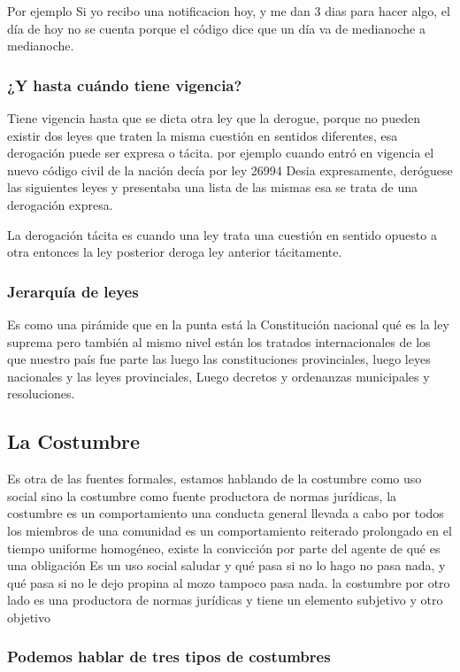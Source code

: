 \documentclass[12pt]{book}
\begin{document}
Por ejemplo
Si yo recibo una notificacion hoy, y me dan 3 dias para hacer algo, el día de hoy no se cuenta porque el código dice que un día va de medianoche a medianoche.

\subsubsection{¿Y hasta cuándo tiene vigencia?}
Tiene vigencia hasta que se dicta otra ley que la derogue, porque no pueden existir dos leyes que traten la misma cuestión en sentidos diferentes, esa derogación puede ser expresa o tácita.
por ejemplo cuando entró en vigencia el nuevo código civil de la nación decía por ley 26994 Desia expresamente, deróguese las siguientes leyes y presentaba una lista de las mismas esa se trata de una derogación expresa.

La derogación tácita es cuando una ley trata una cuestión en sentido opuesto a otra entonces la ley posterior deroga ley anterior tácitamente.

\subsubsection{Jerarquía de leyes}
Es como una pirámide que en la punta está la Constitución nacional qué es la ley suprema pero también al mismo nivel están los tratados internacionales de los que nuestro país fue parte las luego las constituciones provinciales, luego leyes nacionales y las leyes provinciales, Luego decretos y ordenanzas municipales y resoluciones.

\subsection{La Costumbre}
Es otra de las fuentes formales, estamos hablando de la costumbre como uso social sino la costumbre como fuente productora de normas jurídicas, la costumbre es un comportamiento una conducta general llevada a cabo por todos los miembros de una comunidad es un comportamiento reiterado prolongado en el tiempo uniforme homogéneo, existe la convicción por parte del agente de qué es una obligación 
Es un uso social saludar y qué pasa si no lo hago no pasa nada, y qué pasa si no le dejo propina al mozo tampoco pasa nada.
la costumbre por otro lado es una productora de normas jurídicas y tiene un elemento subjetivo y otro objetivo

\subsubsection{Podemos hablar de tres tipos de costumbres}
\end{document}
